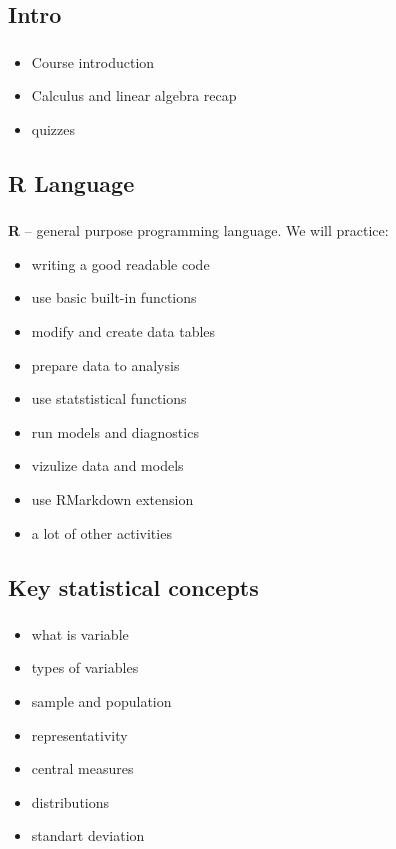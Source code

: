 \documentclass[t, 11pt]{beamer}
\begin{document}
\subsection{Intro}
\begin{frame}\label{}
	\frametitle{\insertsection}
	\frametitle{\insertsubsection}
	
	\begin{itemize}
		\item Course introduction 
		\item Calculus and linear algebra recap
		\item quizzes 
	\end{itemize}
\end{frame}	

\subsection{R Language}
\begin{frame}\label{}
	\frametitle{\insertsection}
	\frametitle{\insertsubsection}
	
\textbf{R} -- general purpose programming language. We will practice:
\begin{itemize}
	\item writing a good readable code
	\item use basic built-in functions 
	\item modify  and create data tables
	\item prepare data to analysis
	\item use statstistical functions
	\item run models and diagnostics 
	\item vizulize data and models
	\item use RMarkdown extension
	\item a lot of other activities 
\end{itemize}	  
\end{frame}	

\subsection{Key statistical concepts}
\begin{frame}\label{}
	\frametitle{\insertsection}
	\frametitle{\insertsubsection}
	
	\begin{itemize}
		\item what is variable
		\item types of variables
		\item sample and population
		\item representativity 
		\item central measures
		\item distributions 
		\item standart deviation
	\end{itemize}	  
\end{frame}	
	
\end{document}
